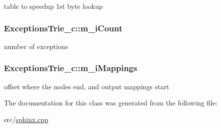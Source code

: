 table to speedup 1st byte lookup 

\hypertarget{classExceptionsTrie__c_abe897f188365bfb27cd2a9f48428abb1}{
\subsubsection[{m\-\_\-i\-Count}]{ Exceptions\-Trie\-\_\-c\-::m\-\_\-i\-Count\hspace{0.3cm}{\ttfamily [protected]}}}\label{classExceptionsTrie__c_abe897f188365bfb27cd2a9f48428abb1}


number of exceptions 

\hypertarget{classExceptionsTrie__c_a3d3c390cfc017b064a309fefa688e901}{
\subsubsection[{m\-\_\-i\-Mappings}]{ Exceptions\-Trie\-\_\-c\-::m\-\_\-i\-Mappings\hspace{0.3cm}{\ttfamily [protected]}}}\label{classExceptionsTrie__c_a3d3c390cfc017b064a309fefa688e901}


offset where the nodes end, and output mappings start 



The documentation for this class was generated from the following file\-:\begin{DoxyCompactItemize}
\item 
src/\hyperlink{sphinx_8cpp}{sphinx.\-cpp}\end{DoxyCompactItemize}
